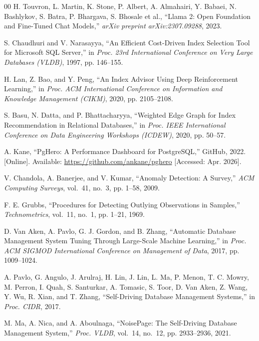 \documentclass[conference]{IEEEtran}
\begin{document}
\begin{thebibliography}{00}
H. Touvron, L. Martin, K. Stone, P. Albert, A. Almahairi, Y. Babaei,
N. Bashlykov, S. Batra, P. Bhargava, S. Bhosale et al.,
``Llama 2: Open Foundation and Fine-Tuned Chat Models,''
\textit{arXiv preprint arXiv:2307.09288}, 2023.

S. Chaudhuri and V. Narasayya,
``An Efficient Cost-Driven Index Selection Tool for Microsoft SQL Server,''
in \textit{Proc. 23rd International Conference on Very Large Databases (VLDB)},
1997, pp. 146--155.

H. Lan, Z. Bao, and Y. Peng,
``An Index Advisor Using Deep Reinforcement Learning,''
in \textit{Proc. ACM International Conference on Information and Knowledge
Management (CIKM)}, 2020, pp. 2105--2108.

S. Basu, N. Datta, and P. Bhattacharyya,
``Weighted Edge Graph for Index Recommendation in Relational Databases,''
in \textit{Proc. IEEE International Conference on Data Engineering Workshops
(ICDEW)}, 2020, pp. 50--57.

A. Kane, ``PgHero: A Performance Dashboard for PostgreSQL,''
GitHub, 2022. [Online]. Available: \url{https://github.com/ankane/pghero}
[Accessed: Apr. 2026].

V. Chandola, A. Banerjee, and V. Kumar,
``Anomaly Detection: A Survey,''
\textit{ACM Computing Surveys}, vol.~41, no.~3, pp. 1--58, 2009.

F. E. Grubbs,
``Procedures for Detecting Outlying Observations in Samples,''
\textit{Technometrics}, vol.~11, no.~1, pp. 1--21, 1969.

D. Van Aken, A. Pavlo, G. J. Gordon, and B. Zhang,
``Automatic Database Management System Tuning Through Large-Scale Machine
Learning,'' in \textit{Proc. ACM SIGMOD International Conference on Management
of Data}, 2017, pp. 1009--1024.

A. Pavlo, G. Angulo, J. Arulraj, H. Lin, J. Lin, L. Ma, P. Menon,
T. C. Mowry, M. Perron, I. Quah, S. Santurkar, A. Tomasic, S. Toor,
D. Van Aken, Z. Wang, Y. Wu, R. Xian, and T. Zhang,
``Self-Driving Database Management Systems,''
in \textit{Proc. CIDR}, 2017.

M. Ma, A. Nica, and A. Aboulnaga,
``NoisePage: The Self-Driving Database Management System,''
\textit{Proc. VLDB}, vol.~14, no.~12, pp. 2933--2936, 2021.


\end{thebibliography}
\end{document}
